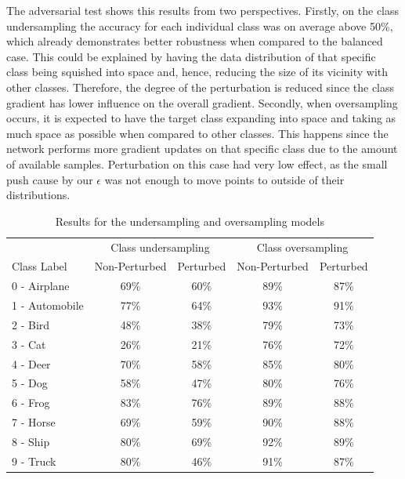 The adversarial test shows this results from two perspectives. Firstly, on the class undersampling the accuracy for each individual class was on average above 50\%, which already demonstrates better robustness when compared to the balanced case. This could be explained by having the data distribution of that specific class being squished into space and, hence, reducing the size of its vicinity with other classes. Therefore, the degree of the perturbation is reduced since the class gradient has lower influence on the overall gradient. Secondly, when oversampling occurs, it is expected to have the target class expanding into space and taking as much space as possible when compared to other classes. This happens since the network performs more gradient updates on that specific class due to the amount of available samples. Perturbation on this case had very low effect, as the small push cause by our $\epsilon$ was not enough to move points to outside of their distributions.
\begin{table}[H]
	\centering
	
	\begin{tabular}{lcccc}
		\toprule
		&\multicolumn{2}{c}{Class undersampling}
		&
		\multicolumn{2}{c}{Class oversampling} \\\cmidrule(r){2-3}\cmidrule(l){4-5}
		Class Label &Non-Perturbed& Perturbed    & Non-Perturbed & Perturbed      \\
		\midrule
		0 - Airplane &69\%& 60\%    & 89\% &87\%      \\
		1 - Automobile &77\%& 64\%    & 93\% &91\%      \\
		2 - Bird &48\%& 38\%    & 79\% &73\%      \\
		3 - Cat &26\%& 21\%    & 76\% &72\%      \\
		4 - Deer &70\%& 58\%    & 85\% &80\%      \\
		5 - Dog &58\%& 47\%    & 80\% &76\%      \\
		6 - Frog &83\%& 76\%    & 89\% &88\%      \\
		7 - Horse &69\%& 59\%    & 90\% &88\%      \\
		8 - Ship &80\%& 69\%    & 92\% &89\%      \\
		9 - Truck &80\%& 46\%    & 91\% &87\%      \\
		\bottomrule
	\end{tabular}
	\caption{Results for the undersampling and oversampling models}
	\label{tbl:results}
\end{table}




